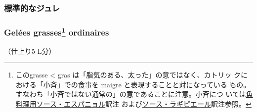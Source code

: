 \begin{recette}
\hypertarget{ux6a19ux6e96ux7684ux306aux30b8ux30e5ux30ec}{%
\subsubsection{標準的なジュレ}\label{ux6a19ux6e96ux7684ux306aux30b8ux30e5ux30ec}}

\hypertarget{gelee-grasse-ordinaire}{%
\subsubsection[Gelées grasses ordinaires]{\texorpdfstring{Gelées
grasses\footnote{このgrasse \textless{} gras
  は「脂気のある、太った」の意ではなく、カトリッ
  クにおける「小斉」での食事を maigre と表現することと対になっている
  もの。すなわち「小斉ではない通常の」の意であることに注意。小斉につ
  いては\protect\hyperlink{sauce-espagnole-maigre}{魚料理用ソース・エスパニョル}訳注
  および\protect\hyperlink{sauce-laguipiere}{ソース・ラギピエール}訳注参照。}
ordinaires}{Gelées grasses ordinaires}}\label{gelee-grasse-ordinaire}}


（仕上り5 L分）


\end{recette}
